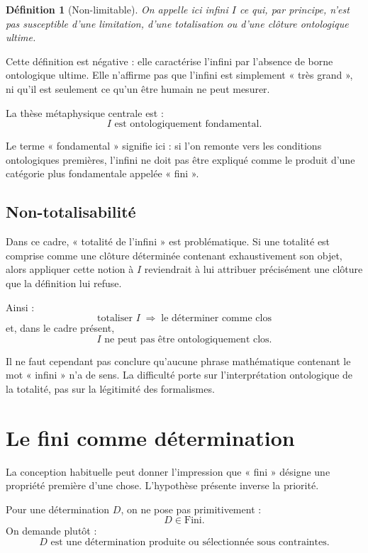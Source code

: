 \documentclass[11pt,a4paper]{article}
\newtheorem{definition}{Définition}
\begin{document}
\begin{definition}[Non-limitable]
On appelle ici \emph{infini} \(I\) ce qui, par principe, n'est pas susceptible
d'une limitation, d'une totalisation ou d'une clôture ontologique ultime.
\end{definition}

Cette définition est négative : elle caractérise l'infini par l'absence de
borne ontologique ultime. Elle n'affirme pas que l'infini est simplement
« très grand », ni qu'il est seulement ce qu'un être humain ne peut mesurer.

La thèse métaphysique centrale est :
\[
\boxed{\text{\(I\) est ontologiquement fondamental.}}
\]

Le terme « fondamental » signifie ici : si l'on remonte vers les conditions
ontologiques premières, l'infini ne doit pas être expliqué comme le produit
d'une catégorie plus fondamentale appelée « fini ».

\subsection{Non-totalisabilité}

Dans ce cadre, « totalité de l'infini » est problématique. Si une totalité
est comprise comme une clôture déterminée contenant exhaustivement son objet,
alors appliquer cette notion à \(I\) reviendrait à lui attribuer précisément
une clôture que la définition lui refuse.

Ainsi :
\[
\boxed{\text{totaliser \(I\)}\;\Longrightarrow\;\text{le déterminer comme clos}}
\]
et, dans le cadre présent,
\[
\boxed{\text{\(I\) ne peut pas être ontologiquement clos.}}
\]

Il ne faut cependant pas conclure qu'aucune phrase mathématique contenant
le mot « infini » n'a de sens. La difficulté porte sur l'interprétation
ontologique de la totalité, pas sur la légitimité des formalismes.

\section{Le fini comme détermination}

La conception habituelle peut donner l'impression que « fini » désigne une
propriété première d'une chose. L'hypothèse présente inverse la priorité.

Pour une détermination \(D\), on ne pose pas primitivement :
\[
D\in\text{Fini}.
\]
On demande plutôt :
\[
\boxed{D\text{ est une détermination produite ou sélectionnée sous contraintes}.}
\]
\end{document}
